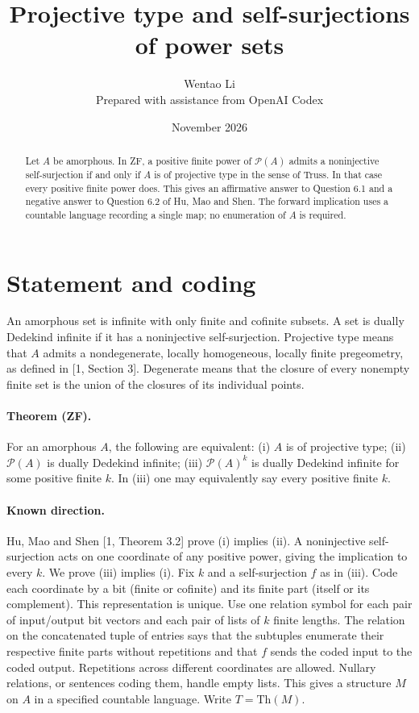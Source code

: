 \documentclass[11pt]{article}
\title{Projective type and self-surjections of power sets}
\author{Wentao Li\\[2pt]\small Prepared with assistance from OpenAI Codex}
\date{November 2026}
\begin{document}
\maketitle
\begin{abstract}
Let $A$ be amorphous. In ZF, a positive finite power of $\mathcal P(A)$ admits a noninjective self-surjection if and only if $A$ is of projective type in the sense of Truss. In that case every positive finite power does. This gives an affirmative answer to Question 6.1 and a negative answer to Question 6.2 of Hu, Mao and Shen. The forward implication uses a countable language recording a single map; no enumeration of $A$ is required.
\end{abstract}
\section{Statement and coding}
An amorphous set is infinite with only finite and cofinite subsets. A set is dually Dedekind infinite if it has a noninjective self-surjection. Projective type means that $A$ admits a nondegenerate, locally homogeneous, locally finite pregeometry, as defined in [1, Section 3]. Degenerate means that the closure of every nonempty finite set is the union of the closures of its individual points.
\paragraph{Theorem (ZF).} For an amorphous $A$, the following are equivalent: (i) $A$ is of projective type; (ii) $\mathcal P(A)$ is dually Dedekind infinite; (iii) $\mathcal P(A)^k$ is dually Dedekind infinite for some positive finite $k$. In (iii) one may equivalently say every positive finite $k$.
\paragraph{Known direction.} Hu, Mao and Shen [1, Theorem 3.2] prove (i) implies (ii). A noninjective self-surjection acts on one coordinate of any positive power, giving the implication to every $k$. We prove (iii) implies (i).
Fix $k$ and a self-surjection $f$ as in (iii). Code each coordinate by a bit (finite or cofinite) and its finite part (itself or its complement). This representation is unique. Use one relation symbol for each pair of input/output bit vectors and each pair of lists of $k$ finite lengths. The relation on the concatenated tuple of entries says that the subtuples enumerate their respective finite parts without repetitions and that $f$ sends the coded input to the coded output. Repetitions across different coordinates are allowed. Nullary relations, or sentences coding them, handle empty lists. This gives a structure $M$ on $A$ in a specified countable language. Write $T=\mathrm{Th}(M)$.
\end{document}
